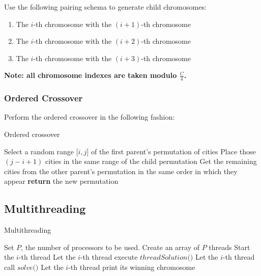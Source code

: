 \documentclass[twoside,twocolumn]{article}
\begin{document}
  Use the following pairing schema to generate child chromosomes:
  
  \begin{enumerate}
  \item The $i$-th chromosome with the $(i + 1)$-th chromosome
  \item The $i$-th chromosome with the $(i + 2)$-th chromosome
  \item The $i$-th chromosome with the $(i + 3)$-th chromosome
  \end{enumerate} 
  
  \textbf{Note: all chromosome indexes are taken modulo $\frac{C}{4}$.}
  
  \subsubsection{Ordered Crossover}
  
  Perform the ordered crossover in the following fashion:
  
  \begin{algorithm}
          \caption{Ordered crossover}\label{oc}
          {\fontsize{6}{6}\selectfont \begin{algorithmic}[1]
              \State Select a random range $\big[i, j\big]$ of the first parent's permutation of cities
              \State Place those $(j - i + 1)$ cities in the same range of the child permutation
              \State Get the remaining cities from the other parent’s permutation in the same order in which they appear
              \State \textbf{return} the new permutation
              \EndProcedure
          \end{algorithmic}}
  \end{algorithm}
  
  \subsection{Multithreading}
  
  \begin{algorithm}
          \caption{Multithreading}\label{oc}
          {\fontsize{7}{7}\selectfont \begin{algorithmic}[1]
              \State Set $P$, the number of processors to be used.
              \State Create an array of $P$ threads
                \State Start the $i$-th thread
                \State Let the $i$-th thread execute $threadSolution\big(\big)$ 
                \State Let the $i$-th thread call $solve\big(\big)$
                \State Let the $i$-th thread print its winning chromosome
              \EndFor
              \EndProcedure
          \end{algorithmic}}
  \end{algorithm}
  
\end{document}
